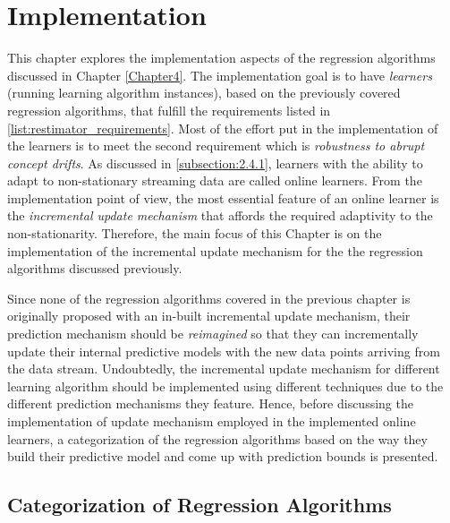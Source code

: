 
\chapter{Implementation} %
\label{Chapter5} %


This chapter explores the implementation aspects of the regression algorithms discussed in Chapter \ref{Chapter4}. The implementation goal is to have \textit{learners} (running learning algorithm instances), based on the previously covered regression algorithms, that fulfill the requirements listed in \ref{list:restimator_requirements}. Most of the effort put in the implementation of the learners is to meet the second requirement which is \textit{robustness to abrupt concept drifts}. As discussed in \ref{subsection:2.4.1}, learners with the ability to adapt to non-stationary streaming data are called online learners. From the implementation point of view, the most essential feature of an online learner is the \textit{incremental update mechanism} that affords the required adaptivity to the non-stationarity. Therefore, the main focus of this Chapter is on the implementation of the incremental update mechanism for the the regression algorithms discussed previously. 

Since none of the regression algorithms covered in the previous chapter is originally proposed with an in-built incremental update mechanism, their prediction mechanism should be \textit{reimagined} so that they can incrementally update their internal predictive models with the new data points arriving from the data stream. Undoubtedly, the incremental update mechanism for different learning algorithm should be implemented using different techniques due to the different prediction mechanisms they feature. Hence, before discussing the implementation of update mechanism employed in the implemented online learners, a categorization of the regression algorithms based on the way they build their predictive model and come up with prediction bounds is presented. 

\section{Categorization of Regression Algorithms}

